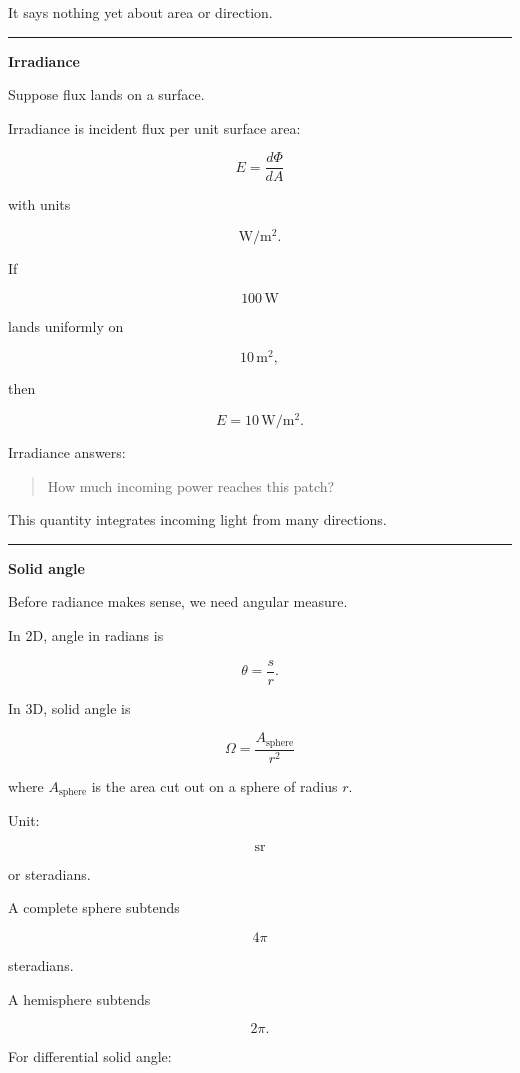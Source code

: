 It says nothing yet about area or direction.

\begin{center}\rule{0.5\linewidth}{0.5pt}\end{center}

\textbf{Irradiance}

Suppose flux lands on a surface.

Irradiance is incident flux per unit surface area:

\[
\boxed{
E=\frac{d\Phi}{dA}
}
\]

with units

\[
\mathrm{W/m^2}.
\]

If

\[
100\,\mathrm W
\]

lands uniformly on

\[
10\,\mathrm{m^2},
\]

then

\[
E=10\,\mathrm{W/m^2}.
\]

Irradiance answers:

\begin{quote}
How much incoming power reaches this patch?
\end{quote}

This quantity integrates incoming light from many directions.

\begin{center}\rule{0.5\linewidth}{0.5pt}\end{center}

\textbf{Solid angle}

Before radiance makes sense, we need angular measure.

In 2D, angle in radians is

\[
\theta=\frac{s}{r}.
\]

In 3D, solid angle is

\[
\boxed{
\Omega=\frac{A_{\text{sphere}}}{r^2}
}
\]

where \(A_{\text{sphere}}\) is the area cut out on a sphere of radius \(r\).

Unit:

\[
\mathrm{sr}
\]

or steradians.

A complete sphere subtends

\[
4\pi
\]

steradians.

A hemisphere subtends

\[
2\pi.
\]

For differential solid angle:

